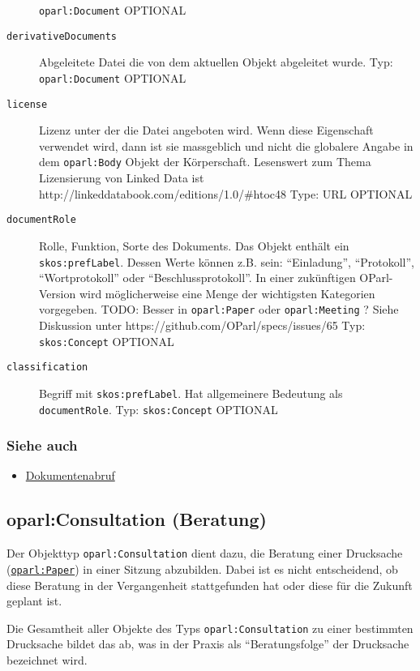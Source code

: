 \documentclass[,a4paper]{article}
\begin{document}
\begin{description}
\texttt{oparl:Document} OPTIONAL
\item[\texttt{derivativeDocuments}]
Abgeleitete Datei die von dem aktuellen Objekt abgeleitet wurde. Typ:
\texttt{oparl:Document} OPTIONAL
\item[\texttt{license}]
Lizenz unter der die Datei angeboten wird. Wenn diese Eigenschaft
verwendet wird, dann ist sie massgeblich und nicht die globalere Angabe
in dem \texttt{oparl:Body} Objekt der Körperschaft. Lesenswert zum Thema
Lizensierung von Linked Data ist
http://linkeddatabook.com/editions/1.0/\#htoc48 Type: URL OPTIONAL
\item[\texttt{documentRole}]
Rolle, Funktion, Sorte des Dokuments. Das Objekt enthält ein
\texttt{skos:prefLabel}. Dessen Werte können z.B. sein: ``Einladung'',
``Protokoll'', ``Wortprotokoll'' oder ``Beschlussprotokoll''. In einer
zukünftigen OParl-Version wird möglicherweise eine Menge der wichtigsten
Kategorien vorgegeben. TODO: Besser in \texttt{oparl:Paper} oder
\texttt{oparl:Meeting} ? Siehe Diskussion unter
https://github.com/OParl/specs/issues/65 Typ: \texttt{skos:Concept}
OPTIONAL
\item[\texttt{classification}]
Begriff mit \texttt{skos:prefLabel}. Hat allgemeinere Bedeutung als
\texttt{documentRole}. Typ: \texttt{skos:Concept} OPTIONAL
\end{description}

\subsubsection{Siehe auch}\label{siehe-auch}

\begin{itemize}
\itemsep1pt\parskip0pt
\item
  \hyperref[dokumentenabruf]{Dokumentenabruf}
\end{itemize}

\subsection{oparl:Consultation (Beratung)}\label{oparlux5fconsultation}

Der Objekttyp \texttt{oparl:Consultation} dient dazu, die Beratung einer
Drucksache (\hyperref[oparlux5fpaper]{\texttt{oparl:Paper}}) in einer
Sitzung abzubilden. Dabei ist es nicht entscheidend, ob diese Beratung
in der Vergangenheit stattgefunden hat oder diese für die Zukunft
geplant ist.

Die Gesamtheit aller Objekte des Typs \texttt{oparl:Consultation} zu
einer bestimmten Drucksache bildet das ab, was in der Praxis als
``Beratungsfolge'' der Drucksache bezeichnet wird.
\end{document}
